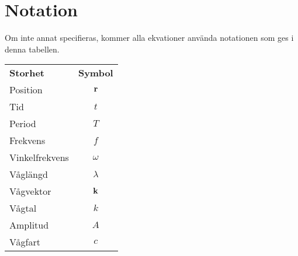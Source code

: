 \section{Notation}
Om inte annat specifieras, kommer alla ekvationer använda notationen som ges i denna tabellen.

\begin{table}[!h]
	\centering
	\begin{tabular}{| l | c |}
		\hline
		\textbf{Storhet} & \multicolumn{1}{|l|}{\textbf{Symbol}}\\
		Position         & $\vect{r}$ \\
		\hline
		Tid              & $t$ \\
		\hline
		Period           & $T$ \\
		\hline
		Frekvens         & $f$ \\
		\hline
		Vinkelfrekvens   & $\omega$ \\
		\hline
		Våglängd         & $\lambda$ \\
		\hline
		Vågvektor        & $\vect{k}$ \\
		\hline
		Vågtal           & $k$ \\
		\hline
		Amplitud         & $A$ \\
		\hline
		Vågfart          & $c$ \\
		\hline
	\end{tabular}
\end{table}